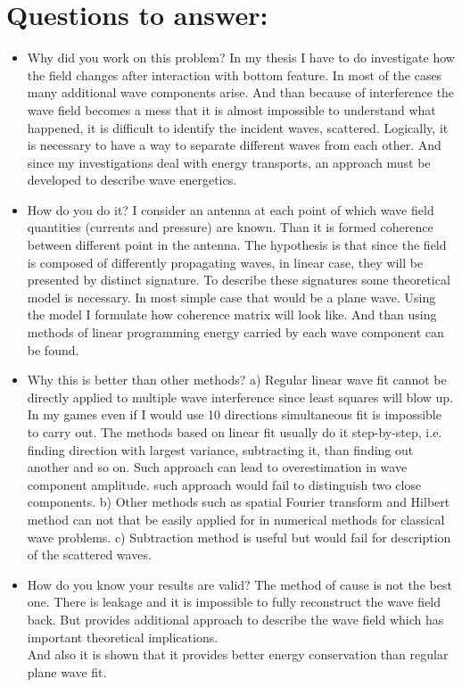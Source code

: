 \section*{Questions to answer:}
\begin{itemize}
\item Why did you work on this problem?
In my thesis I have to do investigate how the field changes after interaction with bottom feature. In most of the cases many additional wave components arise. And than because of interference the wave field becomes a mess that it is almost impossible to understand what happened, it is difficult to identify the incident waves, scattered. Logically, it is necessary to have a way to separate different waves from each other. And since my investigations deal with energy transports, an approach must be developed to describe wave energetics.

\item How do you do it?
I consider an antenna at each point of which wave field quantities (currents and pressure) are known. Than it is formed coherence between different point in the antenna. The hypothesis is that since the field is composed of differently propagating waves, in linear case, they will be presented by distinct signature. To describe these signatures some theoretical model is necessary. In most simple case that would be a plane wave. Using the model I formulate how coherence matrix will look like. And than using methods of linear programming energy carried by each wave component can be found.

\item Why this is better than other methods?
a) Regular linear wave fit cannot be directly applied to multiple wave interference since least squares will blow up. In my games even if I would use 10 directions simultaneous fit is impossible to carry out. The methods based on linear fit usually do it step-by-step, i.e. finding direction with largest variance, subtracting it, than finding out another and so on. Such approach can lead to overestimation in wave component amplitude. such approach would fail to distinguish two close components.
b) Other methods such as spatial Fourier transform and Hilbert method can not that be easily applied for in numerical methods for classical wave problems.
c) Subtraction method is useful but would fail for description of the scattered waves.

\item How do you know your results are valid?
The method of cause is not the best one. There is leakage and it is impossible to fully reconstruct the wave field back. But provides additional approach to describe the wave field which has important theoretical implications.\\
And also it is shown that it provides better energy conservation than regular plane wave fit.


\end{itemize}
